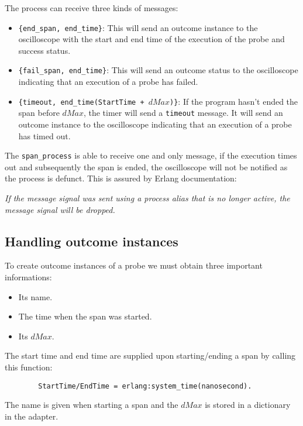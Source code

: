         The process can receive three kinds of messages:
        \begin{itemize}
            \item \texttt{\{end\_span, end\_time\}}: This will send an outcome instance to the oscilloscope with the start and end time of the execution of the probe and success status.
            \item \texttt{\{fail\_span, end\_time\}}: This will send an outcome status to the oscilloscope indicating that an execution of a probe has failed.
            \item \texttt{\{timeout, end\_time(StartTime + $dMax$)\}}: If the program hasn't ended the span before $dMax$, the timer will send a \texttt{timeout} message. It will send an outcome instance to the oscilloscope indicating that an execution of a probe has timed out.
        \end{itemize}
        The \texttt{span\_process} is able to receive one and only message, if the execution times out and subsequently the span is ended, the oscilloscope will not be notified as the process is defunct. This is assured by Erlang documentation:
        \begin{center}
            \textit{If the message signal was sent using a process alias that is no longer active, the message signal will be dropped.} \cite{erl-s}
        \end{center}

    \subsection{Handling outcome instances}
        To create outcome instances of a probe we must obtain three important informations:
        \begin{itemize}
            \item Its name.
            \item The time when the span was started.
            \item Its $dMax$.
        \end{itemize}
        
        The start time and end time are supplied upon starting/ending a span by calling this function:
        \begin{verbatim}
        StartTime/EndTime = erlang:system_time(nanosecond).
        \end{verbatim}
        The name is given when starting a span and the $dMax$ is stored in a dictionary in the adapter. 

